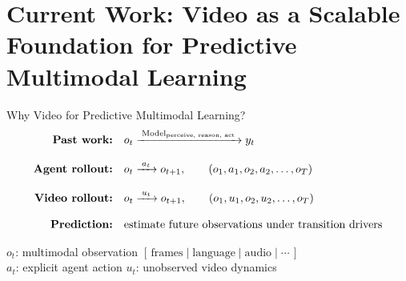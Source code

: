 \section{Current Work: Video as a Scalable Foundation for Predictive Multimodal Learning}

\begin{frame}[label=short-why-video]{\Large Why Video for Predictive Multimodal Learning?}
  \centering
  \vspace{0.20cm}
  {\fontsize{10}{12}\selectfont
  \[
  \begin{aligned}
  \textbf{Past work:}\quad
  & o_t
    \xrightarrow{\;\text{Model}_{\text{\tiny perceive, reason, act}}\;}
    y_t
  \\[0.85em]
  \textbf{Agent rollout:}\quad
  & o_t \xrightarrow{\;a_t\;} o_{t+1},
    \qquad
    (o_1, a_1, o_2, a_2, \ldots, o_T)
  \\[0.85em]
  \textbf{Video rollout:}\quad
  & o_t \xrightarrow{\;u_t\;} o_{t+1},
    \qquad
    (o_1, u_1, o_2, u_2, \ldots, o_T)
  \\[0.85em]
  \textbf{Prediction:}\quad
  & \text{estimate future observations under transition drivers}
  \end{aligned}
  \]
  }

  \vspace{-0.06cm}
  {\fontsize{7.7}{9}\selectfont
  \(o_t\): multimodal observation \([\,\text{frames} \mid \text{language} \mid \text{audio} \mid \cdots\,]\) \\
  \(a_t\): explicit agent action
  \quad
  \(u_t\): unobserved video dynamics}

  \vspace{0.20cm}
\end{frame}


